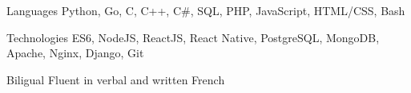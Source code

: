 


\begin{cvskills}

\cvskill
{Languages} %
{Python, Go, C, C++, C\#, SQL, PHP, JavaScript, HTML/CSS, Bash} %


\cvskill
{Technologies} %
{ES6, NodeJS, ReactJS, React Native, PostgreSQL, MongoDB, Apache, Nginx, Django, Git} %


\cvskill
{Biligual} %
{Fluent in verbal and written French} %


\end{cvskills}
\addvspace{2ex}
